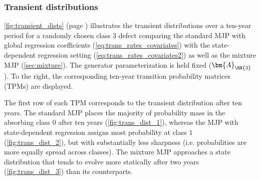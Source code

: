 \subsubsection{Transient distributions}

\cref{fig:transient_dists} (page \pageref{fig:transient_dists}) illustrates the transient distributions over a ten-year period for a randomly chosen class $3$ defect
comparing the standard MJP with global regression coefficients (\cref{eq:trans_rates_covariates}) with the state-dependent regression setting (\cref{eq:trans_rates_covariates2}) as well as the mixture MJP (\cref{sec:mixture}). The generator parameterization is held fixed ($\bm{A}_{\RN{3}}$). To the right, the corresponding ten-year transition probability matrices (TPMs) are displayed.



The first row of each TPM corresponds to the transient distribution after ten years. 
The standard MJP places the majority of probability mass in the absorbing class $0$ after ten years (\cref{fig:trans_dist_1}), whereas the MJP with state-dependent regression assigns most probability at class $1$ (\cref{fig:trans_dist_2}), but with substantially less sharpness (i.e. probabilities are more equally spread across classes). The mixture MJP approaches a state distribution that tends to evolve more statically after two years (\cref{fig:trans_dist_3}) than its counterparts.

